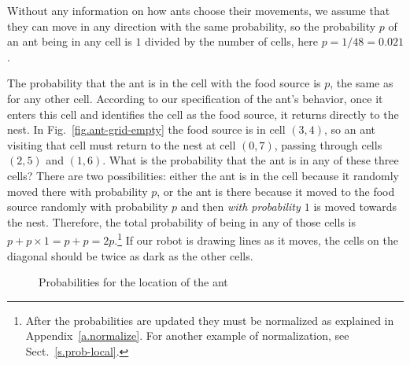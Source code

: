 Without any information on how ants choose their movements, we assume that they can move in any direction with the same probability, so the probability $p$ of an ant being in any cell is $1$ divided by the number of cells, here $p=1/48=0.021$.

The probability that the ant is in the cell with the food source is $p$, the same as for any other cell. According to our specification of the ant's behavior, once it enters this cell and identifies the cell as the food source, it returns directly to the nest. In Fig.~\ref{fig.ant-grid-empty} the food source is in cell $(3,4)$, so an ant visiting that cell must return to the nest at cell $(0,7)$, passing through cells $(2,5)$ and $(1,6)$. What is the probability that the ant is in any of these three cells? There are two possibilities: either the ant is in the cell because it randomly moved there with probability $p$, or the ant is there because it moved to the food source randomly with probability $p$ and then \emph{with probability $1$} is moved towards the nest. Therefore, the total probability of being in any of those cells is $p+p\times 1=p+p=2p$.\footnote{After the probabilities are updated they must be normalized as explained in Appendix~\ref{a.normalize}. For another example of normalization, see Sect.~\ref{s.prob-local}.}  If our robot is drawing lines as it moves, the cells on the diagonal should be twice as dark as the other cells.

\begin{figure}
\begin{center}
\end{center}
\caption{Probabilities for the location of the ant}\label{fig.ant-grid-prob}
\end{figure}

